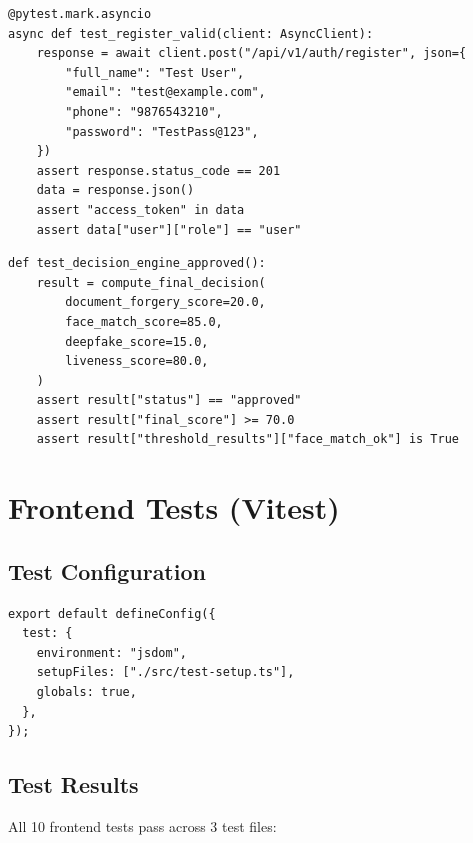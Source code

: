 \begin{lstlisting}[style=pythonstyle, caption=Auth Registration Test]
@pytest.mark.asyncio
async def test_register_valid(client: AsyncClient):
    response = await client.post("/api/v1/auth/register", json={
        "full_name": "Test User",
        "email": "test@example.com",
        "phone": "9876543210",
        "password": "TestPass@123",
    })
    assert response.status_code == 201
    data = response.json()
    assert "access_token" in data
    assert data["user"]["role"] == "user"
\end{lstlisting}

\begin{lstlisting}[style=pythonstyle, caption=Decision Engine Unit Test]
def test_decision_engine_approved():
    result = compute_final_decision(
        document_forgery_score=20.0,
        face_match_score=85.0,
        deepfake_score=15.0,
        liveness_score=80.0,
    )
    assert result["status"] == "approved"
    assert result["final_score"] >= 70.0
    assert result["threshold_results"]["face_match_ok"] is True
\end{lstlisting}

\section{Frontend Tests (Vitest)}

\subsection{Test Configuration}

\begin{lstlisting}[style=tsstyle, caption=Frontend Test Configuration (vitest.config.ts)]
export default defineConfig({
  test: {
    environment: "jsdom",
    setupFiles: ["./src/test-setup.ts"],
    globals: true,
  },
});
\end{lstlisting}

\subsection{Test Results}

All 10 frontend tests pass across 3 test files:

